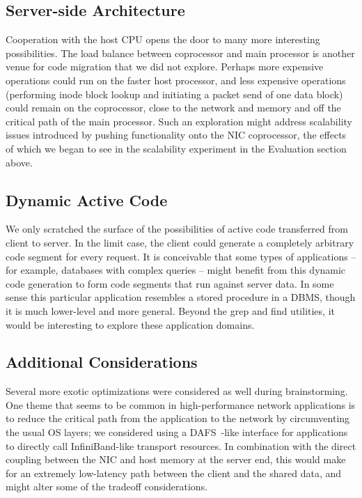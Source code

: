 \documentclass[10pt]{article}
\begin{document}
\subsection{Server-side Architecture}

Cooperation with the host CPU opens the door to many more interesting
possibilities. The load balance between coprocessor and main processor
is another venue for code migration that we did not explore. Perhaps
more expensive operations could run on the faster host processor, and
less expensive operations (performing inode block lookup and
initiating a packet send of one data block) could remain on the
coprocessor, close to the network and memory and off the critical path
of the main processor. Such an exploration might address scalability
issues introduced by pushing functionality onto the NIC coprocessor,
the effects of which we began to see in the scalability experiment in
the Evaluation section above.

\subsection{Dynamic Active Code}

We only scratched the surface of the possibilities of active code
transferred from client to server. In the limit case, the client could
generate a completely arbitrary code segment for every request. It is
conceivable that some types of applications -- for example, databases
with complex queries -- might benefit from this dynamic code
generation to form code segments that run against server data. In some
sense this particular application resembles a stored procedure in a
DBMS, though it is much lower-level and more general. Beyond the grep
and find utilities, it would be interesting to explore these
application domains.

\subsection{Additional Considerations}

Several more exotic optimizations were considered as well during
brainstorming. One theme that seems to be common in high-performance
network applications is to reduce the critical path from the
application to the network by circumventing the usual OS layers; we
considered using a DAFS~\cite{DAFS}-like interface for applications to
directly call InfiniBand-like transport resources. In combination with
the direct coupling between the NIC and host memory at the server end,
this would make for an extremely low-latency path between the client
and the shared data, and might alter some of the tradeoff
considerations.
\end{document}

